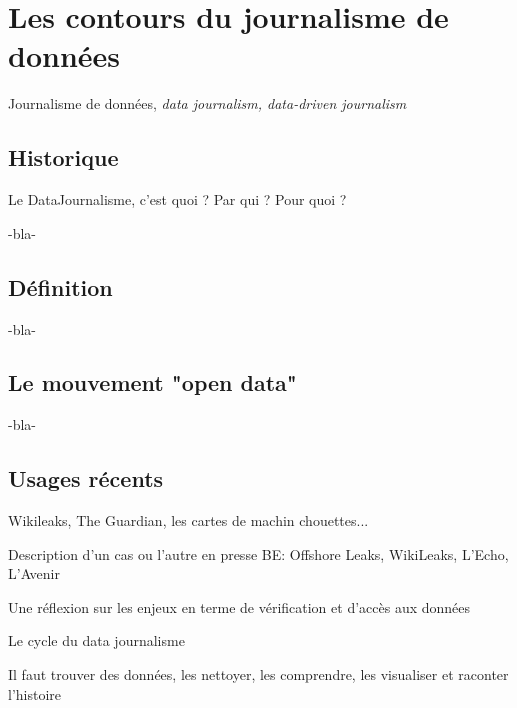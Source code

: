 
\chapter{Les contours du journalisme de données}


Journalisme de données, \em{data journalism}, \em{data-driven journalism}







\section{Historique}

Le DataJournalisme, c'est quoi ? Par qui ? Pour quoi ?

-bla-

\section{Définition}

-bla-

\section{Le mouvement "open data"}

-bla-

\section{Usages récents}

Wikileaks, The Guardian, les cartes de machin chouettes...


Description d'un cas ou l'autre en presse BE: Offshore Leaks, WikiLeaks, L'Echo, L'Avenir

Une réflexion sur les enjeux en terme de vérification et d'accès aux données


Le cycle du data journalisme

Il faut trouver des données, les nettoyer, les comprendre, les visualiser et 
raconter l'histoire
